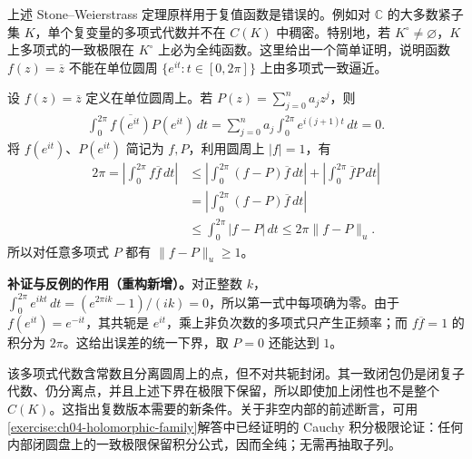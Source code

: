 \documentclass[../../main.tex]{subfiles}%
\begin{document}
上述 Stone--Weierstrass 定理原样用于复值函数是错误的。例如对 $\mathbb C$ 的大多数紧子集 $K$，单个复变量的多项式代数并不在 $C(K)$ 中稠密。特别地，若 $K^\circ\ne\varnothing$，$K$ 上多项式的一致极限在 $K^\circ$ 上必为全纯函数。这里给出一个简单证明，说明函数 $f(z)=\overline z$ 不能在单位圆周 $\{e^{it}:t\in[0,2\pi]\}$ 上由多项式一致逼近。
\begin{example}\label{example:ch04-conjugate-circle-obstruction}
设 $f(z)=\overline z$ 定义在单位圆周上。若 $P(z)=\sum_{j=0}^na_jz^j$，则
\begin{align*}
\int_0^{2\pi}\overline{f(e^{it})}P(e^{it})\,dt
=\sum_{j=0}^na_j\int_0^{2\pi}e^{i(j+1)t}\,dt=0.
\end{align*}
将 $f(e^{it})$、$P(e^{it})$ 简记为 $f,P$，利用圆周上 $|f|=1$，有
\begin{align*}
2\pi=\left|\int_0^{2\pi}f\overline f\,dt\right|
&\le\left|\int_0^{2\pi}(f-P)\overline f\,dt\right|
+\left|\int_0^{2\pi}\overline fP\,dt\right|\\
&=\left|\int_0^{2\pi}(f-P)\overline f\,dt\right|\\
&\le\int_0^{2\pi}|f-P|\,dt\le2\pi\|f-P\|_u.
\end{align*}
所以对任意多项式 $P$ 都有 $\|f-P\|_u\ge1$。
\end{example}
\begin{remark}
\textbf{补证与反例的作用（重构新增）。}对正整数 $k$，$\int_0^{2\pi}e^{ikt}\,dt=(e^{2\pi ik}-1)/(ik)=0$，所以第一式中每项确为零。由于 $f(e^{it})=e^{-it}$，其共轭是 $e^{it}$，乘上非负次数的多项式只产生正频率；而 $f\overline f=1$ 的积分为 $2\pi$。这给出误差的统一下界，取 $P=0$ 还能达到 $1$。

该多项式代数含常数且分离圆周上的点，但不对共轭封闭。其一致闭包仍是闭复子代数、仍分离点，并且上述下界在极限下保留，所以即使加上闭性也不是整个 $C(K)$。这指出复数版本需要的新条件。关于非空内部的前述断言，可用\cref{exercise:ch04-holomorphic-family}解答中已经证明的 Cauchy 积分极限论证：任何内部闭圆盘上的一致极限保留积分公式，因而全纯；无需再抽取子列。
\end{remark}
\end{document}
